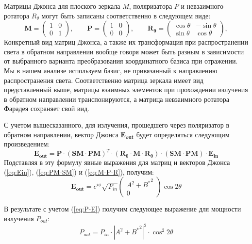 \documentclass{article}
\begin{document}
Матрицы Джонса для плоского зеркала $M$, поляризатора  $P$ и невзаимного ротатора $R_\theta$ могут быть записаны соответственно в следующем виде:
\begin{equation}
	\label{eq:M-P-R}
	\bm{M} = 
	\begin{pmatrix}
		1 & 0 \\
		0 & 1
	\end{pmatrix},\qquad 		
	\bm{P} = 
	\begin{pmatrix}
		1 & 0 \\
		0 & 0
	\end{pmatrix},\qquad 
	\bm{R_\theta} = 
	\begin{pmatrix}
		\cos\theta & -\sin\theta \\
		\sin\theta & \cos\theta
	\end{pmatrix},		
\end{equation}
Конкретный вид матриц Джонса, а также их трансформация при распространении света в обратном направлении вообще говоря может быть разным в зависимости от выбранного варианта преобразования координатного базиса при отражении.
Мы в нашем анализе используем базис, не привязанный к направлению распространения света.
Соответственно матрица зеркала имеет вид представленный выше, матрицы взаимных элементов при прохождении излучения в обратном направлении транспонируются, а матрица невзаимного ротатора Фарадея сохраняет свой вид.

С учетом вышесказанного, для излучения, прошедшего через поляризатор в обратном направлении, вектор Джонса $\bm{E_{out}}$ будет определяться следующим произведением:
\begin{equation}
	\bm{E_{out}} = \bm{P} \cdot (\bm{SM}\cdot \bm{PM})^T\cdot (\bm{R_\theta} \cdot \bm{M} \cdot \bm{R_\theta})\cdot (\bm{SM}\cdot \bm{PM})\cdot \bm{E_{in}}
\end{equation}	
Подставляя в эту формулу явные выражения для матриц и векторов Джонса (\ref{eq:Ein}), (\ref{eq:PM-SM}) и (\ref{eq:M-P-R}), получим:
\begin{equation}
	\bm{E_{out}} =  e^{i\phi} \sqrt{P_{in}} \begin{pmatrix} A^2 + {B^*}^2 \\ 0 \end{pmatrix}\cos 2 \theta
\end{equation}

В результате с учетом (\ref{eq:P-E}) получим следующее выражение для мощности излучения $P_{out}$:
\begin{equation}
	P_{out} = P_{in} \cdot \left| A^2 + {B^*}^2 \right|^2 \cdot \cos^2 2 \theta
\end{equation}
\end{document}
